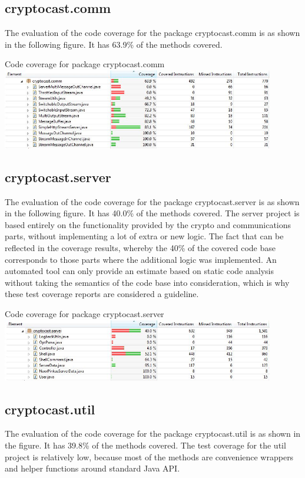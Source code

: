 \documentclass[a4paper,10pt]{scrartcl}
\begin{document}
\subsection{cryptocast.comm}
The evaluation of the code coverage for the package cryptocast.comm is as shown in the following figure.
It has 63.9\% of the methods covered.

\begin{illustration}{Code coverage for package cryptocast.comm}
\includegraphics[width=450px]{figures/images/comm.jpg}
\end{illustration}
\newpage
\subsection{cryptocast.server}
The evaluation of the code coverage for the package cryptocast.server is as shown in the following figure.
It has 40.0\% of the methods covered. The server project is based entirely on the functionality provided by the crypto and communications parts, without implementing a lot of extra or new logic. The fact that can be reflected in the coverage results, whereby the 40\% of the covered code base corresponds to those parts where the additional logic was implemented. An automated tool can only provide an estimate based on static code analysis without taking the semantics of the code base into consideration, which is why these test coverage reports are considered a guideline.

\begin{illustration}{Code coverage for package cryptocast.server}
\includegraphics[width=450px]{figures/images/server.jpg}
\end{illustration}


\subsection{cryptocast.util}
The evaluation of the code coverage for the package cryptocast.util is as shown in the figure.
It has 39.8\% of the methods covered. The test coverage for the util project is relatively low, because most of the methods are convenience wrappers and helper functions around standard Java API.
\end{document}

